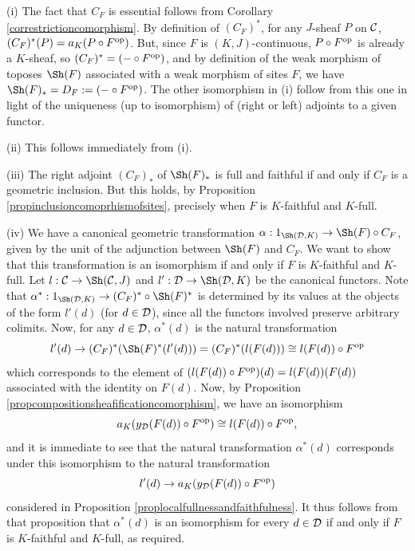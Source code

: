 \documentclass[a4paper,12pt]{article}
\begin{document}
\begin{proofs}
(i) The fact that $C_{F}$ is essential follows from Corollary \ref{correstrictioncomorphism}. By definition of $(C_{F})^{\ast}$, for any $J$-sheaf $P$ on $\cal C$, $(C_{F})^{\ast}(P)=a_{K}(P\circ F^{\textup{op}})$. But, since $F$ is $(K, J)$-continuous, $P\circ F^{\textup{op}}$ is already a $K$-sheaf, so $(C_{F})^{\ast}=(-\circ F^{\textup{op}})$, and by definition of the weak morphism of toposes $\Sh(F)$ associated with a weak morphism of sites $F$, we have $\Sh(F)_{\ast}=D_{F}:=(-\circ F^{\textup{op}})$. The other isomorphism in (i) follow from this one in light of the uniqueness (up to isomorphism) of (right or left) adjoints to a given functor. 

(ii) This follows immediately from (i). 

(iii) The right adjoint $(C_{F})_{\ast}$ of $\Sh(F)_{\ast}$ is full and faithful if and only if $C_{F}$ is a geometric inclusion. But this holds, by Proposition \ref{propinclusioncomoprhismofsites}, precisely when $F$ is $K$-faithful and $K$-full.

(iv) We have a canonical geometric transformation $\alpha:1_{\Sh({\cal D}, K)} \to \Sh(F)\circ C_{F}$, given by the unit of the adjunction between $\Sh(F)$ and $C_{F}$. We want to show that this transformation is an isomorphism if and only if $F$ is $K$-faithful and $K$-full. Let $l:{\cal C}\to \Sh({\cal C}, J)$ and $l':{\cal D}\to \Sh({\cal D}, K)$ be the canonical functors. Note that $\alpha^{\ast}:1_{\Sh({\cal D}, K)}\to (C_{F})^{\ast}\circ \Sh(F)^{\ast}$ is determined by its values at the objects of the form $l'(d)$ (for $d\in {\cal D}$), since all the functors involved preserve arbitrary colimits. Now, for any $d\in {\cal D}$, $\alpha^{\ast}(d)$ is the natural transformation 
\[
l'(d)\to (C_{F})^{\ast}(\Sh(F)^{\ast}(l'(d)))=(C_{F})^{\ast}(l(F(d)))\cong l(F(d))\circ F^{\textup{op}}
\]
which corresponds to the element of $(l(F(d))\circ F^{\textup{op}})(d)=l(F(d))(F(d))$ associated with the identity on $F(d)$. Now, by Proposition \ref{propcompositionsheafificationcomorphism}, we have an isomorphism
\[
a_{K}(y_{\cal D}(F(d))\circ F^{\textup{op}})\cong l(F(d))\circ F^{\textup{op}},
\]
and it is immediate to see that the natural transformation $\alpha^{\ast}(d)$ corresponds under this isomorphism to the natural transformation
\[
l'(d)\to a_{K}(y_{\cal D}(F(d))\circ F^{\textup{op}})
\]  
considered in Proposition \ref{proplocalfullnessandfaithfulness}. It thus follows from that proposition that $\alpha^{\ast}(d)$ is an isomorphism for every $d\in {\cal D}$ if and only if $F$ is $K$-faithful and $K$-full, as required. 
\end{proofs}
\end{document}
